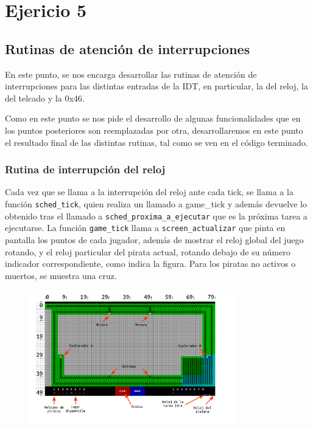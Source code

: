 \section{Ejericio 5}
\subsection{Rutinas de atención de interrupciones}

En este punto, se nos encarga desarrollar las rutinas de atención de interrupciones para las distintas entradas de la IDT, en particular, la del reloj, la del telcado y la 0x46.

Como en este punto se nos pide el desarrollo de algunas funcionalidades que en los puntos posteriores son reemplazadas por otra, desarrollaremos en este punto el resultado final de las distintas rutinas, tal como se ven en el código terminado.

\subsubsection{Rutina de interrupción del reloj}

Cada vez que se llama a la interrupción del reloj ante cada tick, se llama a la función \texttt{sched\_tick}, quien realiza un llamado a game\_tick y además devuelve lo obtenido tras el llamado a \texttt{sched\_proxima\_a\_ejecutar} que es la próxima tarea a ejecutarse.
La función \texttt{game\_tick} llama a \texttt{screen\_actualizar} que pinta en pantalla los puntos de cada jugador, además de mostrar el reloj global del juego rotando, y el reloj particular del pirata actual, rotando debajo de su número indicador correspondiente, como indica la figura. Para los piratas no activos o muertos, se muestra una cruz.


\begin{figure}[ht]
\centering
\includegraphics[width=90mm]{ej_5/img_ej_5.png}
\end{figure}

